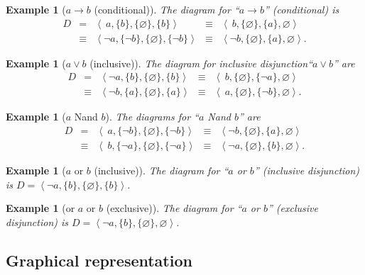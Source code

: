 \documentclass{article}
\newtheorem{example}[definition]{Example}
\begin{document}
\begin{example}[$a \to b$ (conditional)] 
The  diagram for ``$a \to  b$'' (conditional) is 
\[
\begin{array}{rclcl}
D&=&\left<\ a,\{b\}, \{\varnothing\}, \{b\}\right>& \equiv& \left<\ b,\{\varnothing\}, \{ a\}, \varnothing\right> \\ & \equiv & \left< \lnot a,\{ \lnot b \}, \{\varnothing\}, \{ \lnot b\}\right> & \equiv & \left< \lnot b ,\{ \varnothing\}, \{ a\},  \varnothing\right>.
\end{array}\]
\end{example}

\begin{example}[$a  \vee b$ (inclusive)] 
The diagram for inclusive disjunction``$a \vee b$'' are
\[
\begin{array}{rclcl}
D&=&\left<\lnot a,\{b\}, \{\varnothing\}, \{b\}\right> & \equiv& \left<\ b,\{\varnothing\}, \{ \lnot a\}, \varnothing\right>\\ & \equiv &\left< \lnot b,\{ a \}, \{\varnothing\}, \{ a\}\right> & \equiv & \left< \ a,\{ \varnothing\}, \{ \lnot b\},  \varnothing\right>.
\end{array}\]
\end{example}

\begin{example}[$a$ Nand $b$] 
The diagrams for ``$a$ Nand $b$''  are 
\[
\begin{array}{rclcl}
D & = & \left<\ a,\{\lnot b\}, \{\varnothing\}, \{\lnot b\}\right> & \equiv &  \left<\lnot b,\{\varnothing\}, \{ a\}, \varnothing\right>\\ &  \equiv & \left< \ b,\{\lnot a \}, \{\varnothing\}, \{\lnot  a\}\right> & \equiv & \left< \lnot a,\{\varnothing\}, \{ b\}, \varnothing\right>.
\end{array}\]
\end{example}


\begin{example}[$a$ or $b$ (inclusive)] 
The diagram for ``$a$ or $b$'' (inclusive disjunction) is 
$D=\left<\lnot a,\{b\}, \{\varnothing\}, \{b\}\right>$.
\end{example}


\begin{example}[or $a$ or $b$ (exclusive)] 
The diagram for ``$a$ or $b$'' (exclusive disjunction) is 
$D=\left<\lnot a,\{b\}, \{\varnothing\}, 
\varnothing \right>$.
\end{example}


\subsection{Graphical representation}
\end{document}
